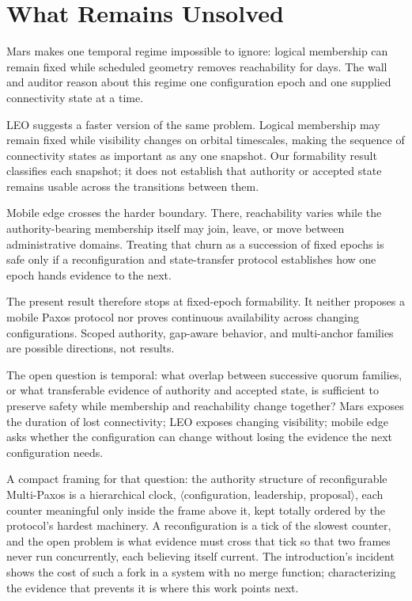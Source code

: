 \documentclass[letterpaper,twocolumn,10pt]{article}
\newcounter{prop}
\begin{document}
\section{What Remains Unsolved}
\label{sec:open}

Mars makes one temporal regime impossible to ignore: logical membership can remain fixed while scheduled geometry removes reachability for days. The wall and auditor reason about this regime one configuration epoch and one supplied connectivity state at a time.

LEO suggests a faster version of the same problem. Logical membership may remain fixed while visibility changes on orbital timescales, making the sequence of connectivity states as important as any one snapshot. Our formability result classifies each snapshot; it does not establish that authority or accepted state remains usable across the transitions between them.

Mobile edge crosses the harder boundary. There, reachability varies while the authority-bearing membership itself may join, leave, or move between administrative domains. Treating that churn as a succession of fixed epochs is safe only if a reconfiguration and state-transfer protocol establishes how one epoch hands evidence to the next.

The present result therefore stops at fixed-epoch formability. It neither proposes a mobile Paxos protocol nor proves continuous availability across changing configurations. Scoped authority, gap-aware behavior, and multi-anchor families are possible directions, not results.

The open question is temporal: what overlap between successive quorum families, or what transferable evidence of authority and accepted state, is sufficient to preserve safety while membership and reachability change together? Mars exposes the duration of lost connectivity; LEO exposes changing visibility; mobile edge asks whether the configuration can change without losing the evidence the next configuration needs.

A compact framing for that question: the authority structure of reconfigurable Multi-Paxos is a hierarchical clock, $\langle$configuration, leadership, proposal$\rangle$, each counter meaningful only inside the frame above it, kept totally ordered by the protocol's hardest machinery. A reconfiguration is a tick of the slowest counter, and the open problem is what evidence must cross that tick so that two frames never run concurrently, each believing itself current. The introduction's incident shows the cost of such a fork in a system with no merge function; characterizing the evidence that prevents it is where this work points next.
\end{document}
